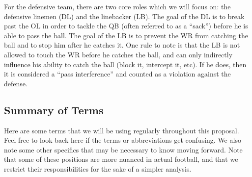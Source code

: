 For the defensive team, there are two core roles which we will focus on: the defensive linemen (DL) and the linebacker (LB). The goal of the DL is to break past the OL in order to tackle the QB (often referred to as a “sack”) before he is able to pass the ball. The goal of the LB is to prevent the WR from catching the ball and to stop him after he catches it. One rule to note is that the LB is not allowed to touch the WR before he catches the ball, and can only indirectly influence his ability to catch the ball (block it, intercept it, etc). If he does, then it is considered a “pass interference” and counted as a violation against the defense. \\ 


\subsection{Summary of Terms}

Here are some terms that we will be using regularly throughout this proposal. Feel free to look back here if the terms or abbreviations get confusing. We also note some other specifics that may be necessary to know moving forward. Note that some of these positions are more nuanced in actual football, and that we restrict their responsibilities for the sake of a simpler analysis.

